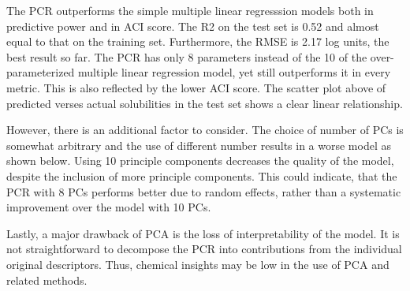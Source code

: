 \documentclass[11pt]{article}
\begin{document}
    The PCR outperforms the simple multiple linear regresssion models both
in predictive power and in ACI score. The R2 on the test set is 0.52 and
almost equal to that on the training set. Furthermore, the RMSE is 2.17
log units, the best result so far. The PCR has only 8 parameters instead
of the 10 of the over-parameterized multiple linear regression model,
yet still outperforms it in every metric. This is also reflected by the
lower ACI score. The scatter plot above of predicted verses actual
solubilities in the test set shows a clear linear relationship.

However, there is an additional factor to consider. The choice of number
of PCs is somewhat arbitrary and the use of different number results in
a worse model as shown below. Using 10 principle components decreases
the quality of the model, despite the inclusion of more principle
components. This could indicate, that the PCR with 8 PCs performs better
due to random effects, rather than a systematic improvement over the
model with 10 PCs.

Lastly, a major drawback of PCA is the loss of interpretability of the
model. It is not straightforward to decompose the PCR into contributions
from the individual original descriptors. Thus, chemical insights may be
low in the use of PCA and related methods.
\end{document}
